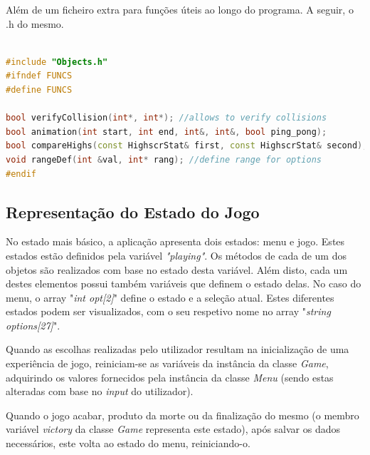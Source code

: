 \documentclass[a4paper,11pt]{article}
\newcommand\tab[1][0.8cm]{\hspace*{#1}}
\begin{document}
\vspace{8pt}

Além de um ficheiro extra para funções úteis ao longo do programa. A seguir, o .h do mesmo.

\begin{lstlisting}[language = C++]

#include "Objects.h"
#ifndef FUNCS
#define FUNCS

bool verifyCollision(int*, int*); //allows to verify collisions
bool animation(int start, int end, int&, int&, bool ping_pong);
bool compareHighs(const HighscrStat& first, const HighscrStat& second);
void rangeDef(int &val, int* rang); //define range for options
#endif

\end{lstlisting}

\vspace{8pt}

\subsection{Representação do Estado do Jogo}

\vspace{8pt}

\tab No estado mais básico, a aplicação apresenta dois estados: menu e jogo. Estes estados estão definidos pela variável \textit{"playing"}. Os métodos de cada de um dos objetos são realizados com base no estado desta variável. Além disto, cada um destes elementos possui também variáveis que definem o estado delas. No caso do menu, o array "\textit{int opt[2]}" define o estado e a seleção atual. Estes diferentes estados podem ser visualizados, com o seu respetivo nome no array  "\textit{string options[27]}".

\vspace{8pt}

Quando as escolhas realizadas pelo utilizador resultam na inicialização de uma experiência de jogo, reiniciam-se as variáveis da instância da classe \textit{Game}, adquirindo os valores fornecidos pela instância da classe \textit{Menu} (sendo estas alteradas com base no \textit{input} do utilizador).

\vspace{8pt}

Quando o jogo acabar, produto da morte ou da finalização do mesmo (o membro variável \textit{victory} da classe \textit{Game} representa este estado), após salvar os dados necessários, este volta ao estado do menu, reiniciando-o.
\end{document}
